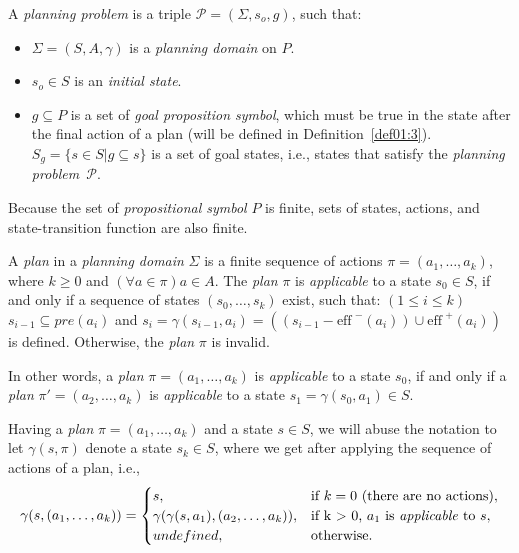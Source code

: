 \begin{defn}\label{def01:2}
  A \emph{planning problem} is a triple $\mathcal{P}=(\Sigma,s_o,g)$, such that:

  \begin{itemize}
    \item $\Sigma = (S, A, \gamma)$ is a \emph{planning domain} on $P$.
    
    \item $s_o \in S$ is an \emph{initial state}.
    
    \item $g \subseteq P$ is a set of \emph{goal proposition symbol}, which must be true in the state after the final action of a plan (will be defined in Definition~\ref{def01:3}). $S_g=\{s \in S | g \subseteq s\}$ is a set of goal states, i.e., states that satisfy the \emph{planning problem}~$\mathcal{P}.$
  \end{itemize}
\end{defn}

\noindent
Because the set of \emph{propositional symbol} $P$ is finite, sets of states, actions, and state-transition function are also finite.

\begin{defn}\label{def01:3}
  A \emph{plan} in a \emph{planning domain} $\Sigma$ is a finite sequence of actions $\pi=(a_1,\dots,a_k)$, where $k \geq 0$ and $(\forall a \in \pi) a \in A$. The \emph{plan} $\pi$ is \emph{applicable} to a state $s_0 \in S$, if and only if a sequence of states $(s_0,\dots,s_k)$ exist, such that: \mbox{$(1 \leq i \leq k)$} $s_{i-1} \subseteq pre(a_i)$ and $s_i = \gamma(s_{i-1},a_i) = ((s_{i-1}-\text{eff}^{\,\,-}(a_i)) \cup \text{eff}^{\,\,+}(a_i))$ is defined. Otherwise, the \emph{plan} $\pi$ is invalid. 

  \medskip\noindent
  In other words, a \emph{plan} $\pi=(a_1,\dots,a_k)$ is \emph{applicable} to a state $s_0$, if and only if a \emph{plan} $\pi'=(a_2,\dots,a_k)$ is \emph{applicable} to a state $s_1=\gamma(s_0,a_1) \in S$.

  \medskip\noindent
  Having a \emph{plan} $\pi=(a_1,\dots,a_k)$ and a state $s \in S$, we will abuse the notation to let $\gamma(s,\pi)$ denote a state $s_k \in S$, where we get after applying the sequence of actions of a plan, i.e.,
    \[
    \gamma(s,(a_1,\dots,a_k))=
    \begin{cases}
    s, & \text{if $k=0$ (there are no actions)},\\
    \gamma(\gamma(s,a_1),(a_2,\dots,a_k)), & \text{if k $>$ 0, $a_1$ is \emph{applicable} to $s$}, \\
    undefined, & \text{otherwise}.
    \end{cases}
    \]
\end{defn}



